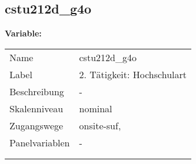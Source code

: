 	
	
	\subsection{cstu212d\_g4o}
	\label{subSection:cstu212d_g4o}

	\noindent\textbf{Variable:}\\
		\begin{tabular}{lL{11.3cm}}
			\label{tableVariable:cstu212d_g4o}
			Name & cstu212d\_g4o \\
			Label & 2. Tätigkeit: Hochschulart \\
			Beschreibung & - \\
			Skalenniveau & nominal \\
			Zugangswege &
				onsite-suf,
 \\
			Panelvariablen & -
			 \\
			 \\
 \\
		\end{tabular}






